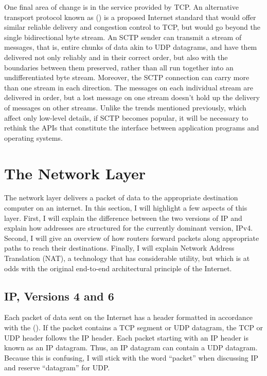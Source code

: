 One final area of change is in the service provided by TCP.  An
alternative transport protocol known as 
() is a proposed Internet
standard that would offer similar reliable delivery and congestion
control to TCP, but would go beyond the single bidirectional byte
stream.  An SCTP sender can transmit a stream of messages, that is,
entire chunks of data akin to UDP datagrams, and have them delivered
not only reliably and in their correct order, but also with the
boundaries between them preserved, rather than all run together into
an undifferentiated byte stream.  Moreover, the SCTP connection can
carry more than one stream in each direction.  The messages on each
individual stream are delivered in order, but a lost message on one
stream doesn't hold up the delivery of messages on other streams.
Unlike the trends mentioned previously, which affect only low-level
details, if SCTP becomes popular, it will be necessary to rethink the
APIs that constitute the interface between application programs and
operating systems.

\section{The Network Layer}\label{network-layer-section}

The network layer delivers a packet of data to the appropriate
destination computer on an internet.  In this section, I will
highlight a few aspects of this layer.  First, I will explain the
difference between the two versions of IP and
explain how addresses are structured for the currently dominant
version, IPv4.  Second, I will give an overview of how routers forward
packets along appropriate paths to reach their destinations.  Finally,
I will explain Network Address Translation (NAT), a technology that has
considerable utility, but which is at odds with the original
end-to-end architectural principle of the Internet.

\subsection{IP, Versions 4 and 6}\label{IP-section}

Each packet of data sent on the Internet has a header
formatted in accordance with the  ().  If the
packet contains a TCP segment or UDP datagram, the TCP or UDP header
follows the IP header.  Each packet starting with an IP header is known as an IP datagram.  Thus, an IP datagram can contain a UDP datagram.  Because this is confusing, I will stick with the word ``packet'' when discussing IP and reserve ``datagram'' for UDP.

